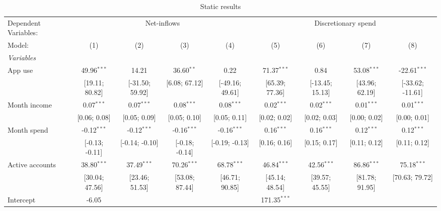 
\begin{table}[htbp]
   \centering
   \tiny
   \begin{threeparttable}[b]
      \caption{\label{tab:reg_static} Static results}
      \begin{tabular}{lcccccccc}
         \tabularnewline \midrule \midrule
         Dependent Variables: & \multicolumn{4}{c}{Net-inflows} & \multicolumn{4}{c}{Discretionary spend}\\
         Model:          & (1)             & (2)             & (3)            & (4)             & (5)              & (6)             & (7)            & (8)\\  
         \midrule
         \emph{Variables}\\
         App use         & 49.96$^{***}$   & 14.21           & 36.60$^{**}$   & 0.22            & 71.37$^{***}$    & 0.84            & 53.08$^{***}$  & -22.61$^{***}$\\   
                         & [19.11; 80.82]  & [-31.50; 59.92] & [6.08; 67.12]  & [-49.16; 49.61] & [65.39; 77.36]   & [-13.45; 15.13] & [43.96; 62.19] & [-33.62; -11.61]\\   
         Month income    & 0.07$^{***}$    & 0.07$^{***}$    & 0.08$^{***}$   & 0.08$^{***}$    & 0.02$^{***}$     & 0.02$^{***}$    & 0.01$^{***}$   & 0.01$^{***}$\\   
                         & [0.06; 0.08]    & [0.05; 0.09]    & [0.05; 0.10]   & [0.05; 0.11]    & [0.02; 0.02]     & [0.02; 0.03]    & [0.00; 0.02]   & [0.00; 0.01]\\   
         Month spend     & -0.12$^{***}$   & -0.12$^{***}$   & -0.16$^{***}$  & -0.16$^{***}$   & 0.16$^{***}$     & 0.16$^{***}$    & 0.12$^{***}$   & 0.12$^{***}$\\   
                         & [-0.13; -0.11]  & [-0.14; -0.10]  & [-0.18; -0.14] & [-0.19; -0.13]  & [0.16; 0.16]     & [0.15; 0.17]    & [0.11; 0.12]   & [0.11; 0.12]\\   
         Active accounts & 38.80$^{***}$   & 37.49$^{***}$   & 70.26$^{***}$  & 68.78$^{***}$   & 46.84$^{***}$    & 42.56$^{***}$   & 86.86$^{***}$  & 75.18$^{***}$\\   
                         & [30.04; 47.56]  & [23.46; 51.53]  & [53.08; 87.44] & [46.71; 90.85]  & [45.14; 48.54]   & [39.57; 45.55]  & [81.78; 91.95] & [70.63; 79.72]\\   
         Intercept       & -6.05           &                 &                &                 & 171.35$^{***}$   &                 &                &   \\   

\end{tabular}
\end{threeparttable}
\end{table}
